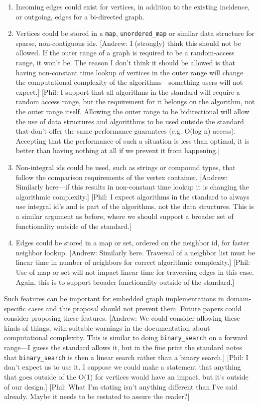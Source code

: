 \documentclass[10pt,onecolumn]{article}
\newcommand{\tcode}[1]{\lstinline[breaklines=true]{#1}}
\newcommand{\comment}[2]{{\color{comment}[{\sc #1:} \textsf{#2}]}}
\newcommand{\phil}[1]{\comment{Phil}{#1}}
\newcommand{\andrew}[1]{\comment{Andrew}{#1}}
\begin{document}
\begin{enumerate}
\item Incoming edges could exist for vertices, in addition to the existing incidence, or outgoing, edges for a bi-directed graph.
\item Vertices could be stored in a \tcode{map}, \tcode{unordered_map} or similar data structure for sparse, non-contiguous ids.
\andrew{I (strongly) think this should not be allowed.  If the outer range of a graph is required to be a random-access range, it won't be.  The reason I don't think it should be allowed is that having non-constant time lookup of vertices in the outer range will change the computational complexity of the algorithms---something users will not expect.}
\phil{I support that all algorithms in the standard will require a random access range, but the requirement for it belongs on the algorithm, not the outer range itself. Allowing the outer range to be bidirectional will allow the use of data structures and algoritthms to be used
outside the standard that don't offer the same performance guarantees (e.g. O(log n) access). Accepting that the performance of such a situation is less than optimal, it is better than having nothing at all if we prevent it from happening.}
\item Non-integral ids could be used, such as strings or compound types, that follow the comparison requirements of the vertex container.  \andrew{Similarly here---if this results in non-constant time lookup it is changing the algorithmic complexity.} 
\phil{I expect algorithms in the standard to always use integral id's and is part of the algorithms, not the data structures.  This is a similar argument as before, where we should support a broader set of functionality outside of the standard.}
\item Edges could be stored in a map or set, ordered on the neighbor id, for faster neighbor lookup.
  \andrew{Similarly here.  Traversal of a neighbor list must be linear time in number of neighbors for correct algorithmic complexity.}
  \phil{Use of map or set will not impact linear time for traversing edges in this case. Again, this is to support broader functionality outside of the standard.}
\end{enumerate}

Such features can be important for embedded graph implementations in domain-specific cases and this proposal should not prevent them. 
Future papers could consider proposing these features.
\andrew{We could consider allowing these kinds of things, with suitable warnings in the documentation about computational complexity.  This is similar to doing \tcode{binary_search} on a forward range---I guess the standard allows it, but in the fine print the standard notes that \tcode{binary_search} is then a linear search rather than a binary search.}
\phil{I don't expect us to use it. I suppose we could make a statement that anything that goes outside of the O(1) for vertices would have an impact, but it's outside of our design.} 
\phil{What I'm stating isn't anything different than I've said already. Maybe it needs to be restated to assure the reader?}
\end{document}

